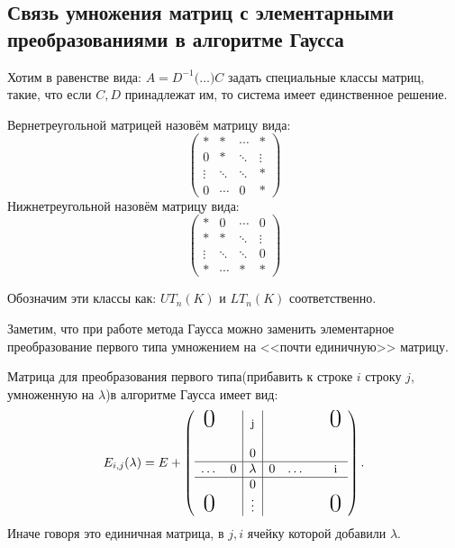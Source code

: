 \subsection{Связь умножения матриц с элементарными преобразованиями в алгоритме Гаусса}
\begin{motivation}
    Хотим в равенстве вида:
    $A = D^{-1}\big(\dots\big)C$
    задать специальные классы матриц, такие, что если
    $C,D$ принадлежат им, то система имеет единственное решение.
\end{motivation}
\begin{definition}
    Вернетреугольной матрицей назовём матрицу вида:$$\begin{pmatrix}
        * & * & \cdots & *\\
        0 & * & \ddots & \vdots\\
        \vdots & \ddots & \ddots & *\\
        0 & \cdots& 0& *
    \end{pmatrix}
    $$
    Нижнетреугольной назовём матрицу вида: $$\begin{pmatrix}
        * & 0 & \cdots & 0\\
        * & * & \ddots & \vdots\\
        \vdots & \ddots & \ddots & 0\\
        * & \cdots& *& *
    \end{pmatrix}
    $$

    Обозначим эти классы как: $UT_n(K)$ и $LT_n(K)$ соответственно.
\end{definition}
\begin{remark}
    Заметим, что при работе метода Гаусса
    можно заменить элементарное преобразование первого типа 
    умножением на <<почти единичную>> матрицу.
\end{remark}
\begin{definition}
    Матрица для преобразования первого типа(прибавить
    к строке $i$ строку $j$, умноженную на $\lambda$)в алгоритме
    Гаусса имеет вид: 
    \[
        E_{i,j}(\lambda) = E +
        \left(\begin{array}{cc|c|cccc}
            \text{\huge 0}&&\text{\small j}&&&&\text{\huge 0}\\
            &&&&&&\\
            &&0&&&&\\
            \hline
            \dots&0&\lambda&0&\dots&&\text{\small i}\\
            \hline
            &&0&&&\\
            \text{\huge 0}&&\vdots&&&&\text{\huge 0}\\
        \end{array}\right) 
    .\] 
    Иначе говоря это единичная матрица, в $j, i$ ячейку 
    которой добавили $\lambda$.
\end{definition}
